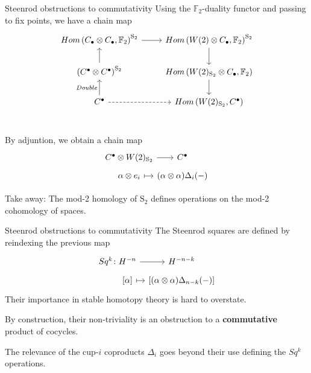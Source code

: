 \documentclass[10pt,t]{beamer}
\newcommand{\F}{\mathbb{F}}
\renewcommand{\S}{\mathrm{S}}
\begin{document}
\begin{frame}[fragile]{Steenrod obstructions to commutativity}
	Using the $\F_2$-duality functor and passing to fix points, we have a chain map 
	\begin{equation*}
	\begin{tikzcd}
	Hom\left(C_\bullet \otimes C_\bullet, \F_2 \right)^{\S_2} \arrow[r] &
	Hom\left(W(2) \otimes C_\bullet, \F_2 \right)^{\S_2} \arrow[d] \\
	\left(C^\bullet \otimes C^\bullet\right)^{\S_2} \arrow[u]&
	Hom\left(W(2)_{\S_2} \otimes C_\bullet, \F_2 \right) \arrow[d] \\
	C^\bullet \arrow[u, "Double"] \arrow[r, dashed]&
	Hom\left(W(2)_{\S_2}, C^\bullet\right) \\
	\end{tikzcd}
	\end{equation*}
	
	\vspace*{-20pt}\pause
	
	By adjuntion, we obtain a chain map
	\vspace*{-2pt}
	\begin{equation*}
	\begin{tikzcd}[row sep=tiny, column sep = tiny]
	C^\bullet \otimes W(2)_{\S_2} \arrow[r] &[-10pt] C^\bullet \\
	\alpha \otimes e_i \arrow[r, |->] & (\alpha \otimes \alpha)\Delta_i(-)
	\end{tikzcd}
	\end{equation*}
	
	\vspace*{-5pt}\pause
	
	\textcolor{pblue}{Take away:} The mod-2 homology of $\S_2$ defines operations on the mod-2 cohomology of spaces.
\end{frame}

\begin{frame}[fragile]{Steenrod obstructions to commutativity}
	The Steenrod squares are defined by reindexing the previous map
	\begin{equation*}
	\begin{tikzcd}[row sep=tiny, column sep=tiny]
	Sq^k \colon H^{-n} \arrow[r] & H^{-n-k} \\
	\phantom{Sq^k \colon}{[\alpha]} \arrow[r, |->] & {\left[(\alpha \otimes \alpha)\Delta_{n-k}(-) \right]}
	\end{tikzcd}
	\end{equation*}
	Their importance in stable homotopy theory is hard to overstate.
	
	\pause \vspace{\baselineskip}
	
	By construction, their non-triviality is an obstruction to a \textbf{commutative} product of cocycles.
	
	\pause \vspace{\baselineskip}
	
	The relevance of the cup-$i$ coproducts $\Delta_i$ goes beyond their use defining the $Sq^k$ operations.
\end{frame}
\end{document}
